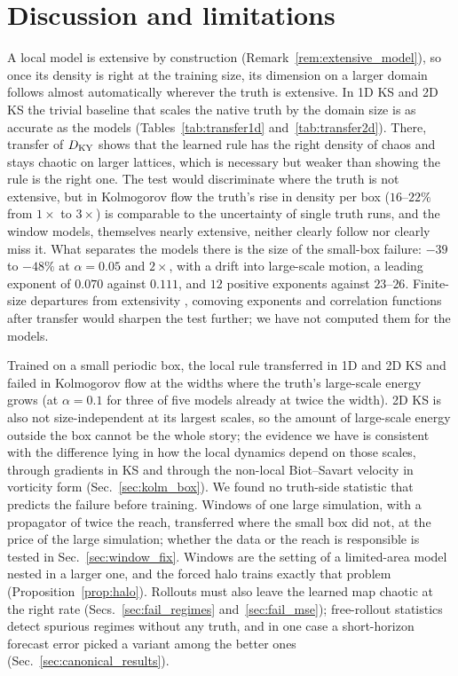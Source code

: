 \section{Discussion and limitations}
\label{sec:discussion}

 A local model is extensive by
construction (Remark~\ref{rem:extensive_model}), so once its density is
right at the training size, its dimension on a larger domain follows
almost automatically wherever the truth is extensive. In 1D KS and 2D KS
the trivial baseline that scales the native truth by the domain size is
as accurate as the models (Tables~\ref{tab:transfer1d}
and~\ref{tab:transfer2d}). There, transfer of $D_{\mathrm{KY}}$ shows that the learned
rule has the right density of chaos and stays chaotic on larger lattices,
which is necessary but weaker than showing the rule is the right one. The
test would discriminate where the truth is not extensive, but in
Kolmogorov flow the truth's rise in density per box ($16$--$22\%$ from $1\times$
to $3\times$) is comparable to the uncertainty of single truth runs, and the
window models, themselves nearly extensive, neither clearly follow nor
clearly miss it. What separates the models there is the size of the
small-box failure: $-39$ to $-48\%$ at $\alpha=0.05$ and $2\times$, with a drift
into large-scale motion, a leading exponent of $0.070$ against $0.111$, and
$12$ positive exponents against $23$--$26$. Finite-size
departures from extensivity \citep{fishmanegolf2006}, comoving exponents
\citep{deisslerkaneko1987} and correlation functions
\citep{egolfgreenside1994} after transfer would sharpen the test further; we have not
computed them for the models.

 Trained on a small periodic
box, the local rule transferred in 1D and 2D KS and failed in Kolmogorov
flow at the widths where the truth's large-scale energy grows (at
$\alpha=0.1$ for three of five models already at twice the width). 2D KS is also not size-independent at its largest scales, so the
amount of large-scale energy outside the box cannot be the whole story;
the evidence we have is consistent with the difference lying in how the
local dynamics depend on those scales, through gradients in KS and through
the non-local Biot--Savart velocity in vorticity form
(Sec.~\ref{sec:kolm_box}). We found no truth-side statistic that predicts
the failure before training. Windows of one large simulation, with a
propagator of twice the reach, transferred where the small box did not,
at the price of the large simulation; whether the data or the reach is
responsible is tested in Sec.~\ref{sec:window_fix}. Windows are the setting of a
limited-area model nested in a larger one, and the forced halo trains
exactly that problem (Proposition~\ref{prop:halo}). Rollouts must also
leave the learned map chaotic at the right rate
(Secs.~\ref{sec:fail_regimes} and~\ref{sec:fail_mse}); free-rollout
statistics detect spurious regimes without any truth, and in one case a
short-horizon forecast error picked a variant among the better ones
(Sec.~\ref{sec:canonical_results}).

